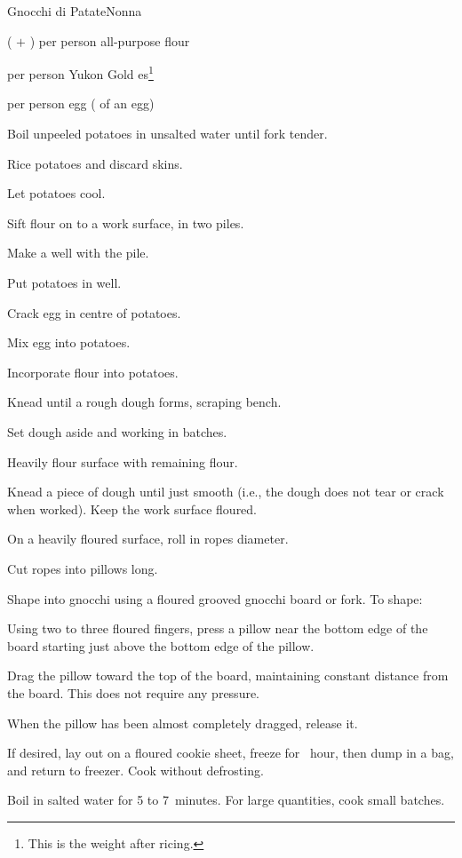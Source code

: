 \begin{recipe}{Gnocchi di Patate}{Nonna}{}

\begin{ingredients}
\item ( $+$ ) per person all-purpose flour
\item {} per person Yukon Gold es\footnote{This is the weight after ricing.}
\item {} per person egg (\eighth{} of an egg)
\end{ingredients}

\begin{directions}
\item Boil unpeeled potatoes in unsalted water until fork tender.
\item Rice potatoes and discard skins.
\item Let potatoes cool.
\item Sift flour on to a work surface, in two piles.
\item Make a well with the  pile.
\item Put potatoes in well.
\item Crack egg in centre of potatoes.
\item Mix egg into potatoes.
\item Incorporate flour into potatoes.
\item Knead until a rough dough forms, scraping bench.
\item Set dough aside and working in batches.
\item Heavily flour surface with remaining flour.
\item Knead a piece of dough until just smooth (i.e., the dough does not tear or crack when worked). Keep the work surface floured.
\item On a heavily floured surface, roll in ropes \inch{\threequarter} diameter.
\item Cut ropes into pillows  long.
\item Shape into gnocchi using a floured grooved gnocchi board or fork. To shape:\par
\begin{enumerate*}
\item Using two to three floured fingers, press a pillow near the bottom edge of the board starting just above the bottom edge of the pillow.
\item Drag the pillow toward the top of the board, maintaining constant distance from the board. This does not require any pressure.
\item When the pillow has been almost completely dragged, release it.
\end{enumerate*}
\item If desired, lay out on a floured cookie sheet, freeze for \half{}~hour, then dump in a bag, and return to freezer. Cook without defrosting.
\item Boil in salted water for 5 to 7~minutes. For large quantities, cook small batches.
\end{directions}


\end{recipe}
